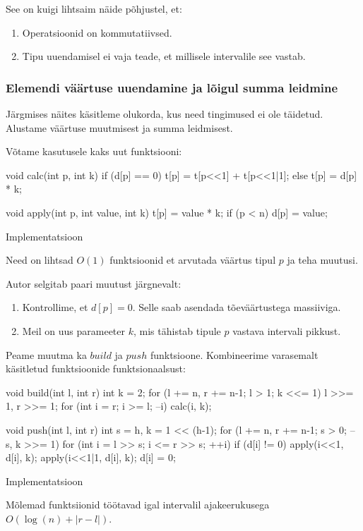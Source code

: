 \documentclass{trkut}
\theoremstyle{definition}
\begin{document}
See on kuigi lihtsaim näide põhjustel, et:
\begin{enumerate}
   \item Operatsioonid on kommutatiivsed.
   \item Tipu uuendamisel ei vaja teade, et millisele intervalile see vastab.
\end{enumerate}

\subsubsection{Elemendi väärtuse uuendamine ja lõigul summa leidmine}
Järgmises näites käsitleme olukorda, kus need tingimused ei ole täidetud.
Alustame väärtuse muutmisest ja summa leidmisest.

Võtame kasutusele kaks uut funktsiooni:
\begin{cclol}
void calc(int p, int k) {
  if (d[p] == 0) t[p] = t[p<<1] + t[p<<1|1];
  else t[p] = d[p] * k;
}

void apply(int p, int value, int k) {
  t[p] = value * k;
  if (p < n) d[p] = value;
}
\end{cclol}
\begin{kk}[H]%
    \caption{Implementatsioon}%
    \label{CPH}%
    \end{kk}
Need on lihtsad $O(1)$ funktsioonid et arvutada väärtus tipul $p$ ja teha muutusi. 

Autor selgitab paari muutust järgnevalt:
\begin{enumerate}
   \item Kontrollime, et $d[p] = 0$. Selle saab asendada tõeväärtustega massiiviga.

   \item Meil on uus parameeter $k$, mis tähistab tipule $p$ vastava intervali pikkust.
\end{enumerate}

Peame muutma ka $build$ ja $push$ funktsioone. Kombineerime varasemalt käsitletud funktsioonide funktsionaalsust:
\begin{cclol}
void build(int l, int r) {
  int k = 2;
  for (l += n, r += n-1; l > 1; k <<= 1) {
    l >>= 1, r >>= 1;
    for (int i = r; i >= l; --i) calc(i, k);
  }
}

void push(int l, int r) {
  int s = h, k = 1 << (h-1);
  for (l += n, r += n-1; s > 0; --s, k >>= 1)
    for (int i = l >> s; i <= r >> s; ++i) if (d[i] != 0) {
      apply(i<<1, d[i], k);
      apply(i<<1|1, d[i], k);
      d[i] = 0;
    }
}
\end{cclol}
\begin{kk}[H]%
    \caption{Implementatsioon}%
    \label{CPH}%
    \end{kk}
Mõlemad funktsiionid töötavad igal intervalil ajakeerukusega $O(\log(n) + |r - l|)$. 
\end{document}
